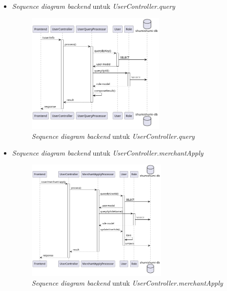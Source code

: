 \documentclass[a4paper]{article}
\begin{document}
\begin{enumerate}
\begin{enumerate}
\begin{itemize}
            \newpage
            \item \textit{Sequence diagram backend} untuk \textit{UserController.query}
            \begin{figure}[h]
                \centering
                \includegraphics*[height=6cm]{diagram/sequence diagram/BE/user controller/query/query.png}
                \caption{\textit{Sequence diagram backend} untuk \textit{UserController.query}}
            \end{figure}

            \item \textit{Sequence diagram backend} untuk \textit{UserController.merchantApply}
            \begin{figure}[h]
                \centering
                \includegraphics*[height=6cm]{diagram/sequence diagram/BE/user controller/merchantApply/merchantApply.png}
                \caption{\textit{Sequence diagram backend} untuk \textit{UserController.merchantApply}}
            \end{figure}


\end{itemize}
\end{enumerate}
\end{enumerate}
\end{document}
